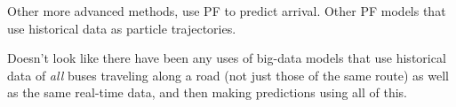 \documentclass[12pt,a4paper]{article}
\begin{document}
Other more advanced methods, \cite{hans-etal:2015} use PF to predict arrival.
Other PF models that use historical data as particle trajectories.


Doesn't look like there have been any uses of big-data models that use
historical data of \emph{all} buses traveling along a road
(not just those of the same route) as well as the same real-time data,
and then making predictions using all of this.













\end{document}
